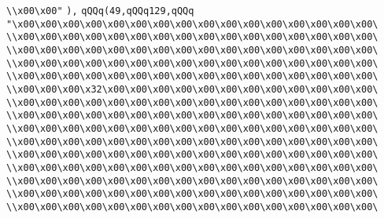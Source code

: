 \verb|\\x00\x00"|\newline
\verb|),|\newline
\verb|qQQq(49,qQQq129,qQQq|\newline
\verb|"\x00\x00\x00\x00\x00\x00\x00\x00\x00\x00\x00\x00\x00\x00\x00\x00\|\newline
\verb|\\x00\x00\x00\x00\x00\x00\x00\x00\x00\x00\x00\x00\x00\x00\x00\x00\|\newline
\verb|\\x00\x00\x00\x00\x00\x00\x00\x00\x00\x00\x00\x00\x00\x00\x00\x00\|\newline
\verb|\\x00\x00\x00\x00\x00\x00\x00\x00\x00\x00\x00\x00\x00\x00\x00\x00\|\newline
\verb|\\x00\x00\x00\x00\x00\x00\x00\x00\x00\x00\x00\x00\x00\x00\x00\x00\|\newline
\verb|\\x00\x00\x00\x32\x00\x00\x00\x00\x00\x00\x00\x00\x00\x00\x00\x00\|\newline
\verb|\\x00\x00\x00\x00\x00\x00\x00\x00\x00\x00\x00\x00\x00\x00\x00\x00\|\newline
\verb|\\x00\x00\x00\x00\x00\x00\x00\x00\x00\x00\x00\x00\x00\x00\x00\x00\|\newline
\verb|\\x00\x00\x00\x00\x00\x00\x00\x00\x00\x00\x00\x00\x00\x00\x00\x00\|\newline
\verb|\\x00\x00\x00\x00\x00\x00\x00\x00\x00\x00\x00\x00\x00\x00\x00\x00\|\newline
\verb|\\x00\x00\x00\x00\x00\x00\x00\x00\x00\x00\x00\x00\x00\x00\x00\x00\|\newline
\verb|\\x00\x00\x00\x00\x00\x00\x00\x00\x00\x00\x00\x00\x00\x00\x00\x00\|\newline
\verb|\\x00\x00\x00\x00\x00\x00\x00\x00\x00\x00\x00\x00\x00\x00\x00\x00\|\newline
\verb|\\x00\x00\x00\x00\x00\x00\x00\x00\x00\x00\x00\x00\x00\x00\x00\x00\|\newline
\verb|\\x00\x00\x00\x00\x00\x00\x00\x00\x00\x00\x00\x00\x00\x00\x00\x00\|\newline
